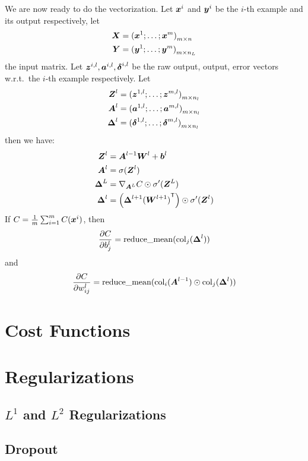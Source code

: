 We are now ready to do the vectorization. Let $\boldsymbol{x}^i$ and $\boldsymbol{y}^i$
be the $i$-th example and its output respectively, let
\begin{align*}
    \boldsymbol{X} &= {(\boldsymbol{x}^1; \ldots; \boldsymbol{x}^m)}_{m \times n}\\
    \boldsymbol{Y} &= {(\boldsymbol{y}^1; \ldots; \boldsymbol{y}^m)}_{m \times n_L}
\end{align*}
the input matrix. 
Let $\boldsymbol{z}^{i, l}, \boldsymbol{a}^{i, l}, \boldsymbol{\delta}^{i, l}$ be the raw output, output, error vectors w.r.t.\ the
$i$-th example respectively. Let 
\begin{align*}
    \boldsymbol{Z}^l &= {(\boldsymbol{z}^{1, l}; \ldots; \boldsymbol{z}^{m, l})}_{m \times n_l}\\
    \boldsymbol{A}^l &= {(\boldsymbol{a}^{1, l}; \ldots; \boldsymbol{a}^{m, l})}_{m \times n_l}\\
    \boldsymbol{\Delta}^l &= {(\boldsymbol{\delta}^{1, l}; \ldots; \boldsymbol{\delta}^{m, l})}_{m \times n_l}
\end{align*}
then we have:
\begin{align}
    \boldsymbol{Z}^l &= \boldsymbol{A}^{l-1} \boldsymbol{W}^l + \boldsymbol{b}^l\\
    \boldsymbol{A}^l &= \sigma(\boldsymbol{Z}^l)\\
    \boldsymbol{\Delta}^L &= \nabla_{\boldsymbol{A}^L}C \odot \sigma'(\boldsymbol{Z}^L)\\
    \boldsymbol{\Delta}^l &= \left(\boldsymbol{\Delta}^{l+1} {(\boldsymbol{W}^{l+1})}^\mathsf{T}\right) \odot \sigma'(\boldsymbol{Z}^l)
\end{align}
If $C = \frac{1}{m}\sum_{i=1}^m C(\boldsymbol{x}^i)$, then
$$\frac{\partial {C}}{\partial {b^l_j}} = \operatorname{reduce\_mean}(\operatorname{col}_j(\boldsymbol{\Delta}^l))$$
and
$$\frac{\partial {C}}{\partial {w^l_{ij}}} = \operatorname{reduce\_mean}(\operatorname{col}_i(\boldsymbol{A}^{l-1}) \odot 
\operatorname{col}_j (\boldsymbol{\Delta}^l))$$

\section{Cost Functions}


\section{Regularizations}
\subsection{$L^1$ and $L^2$ Regularizations}

\subsection{Dropout}